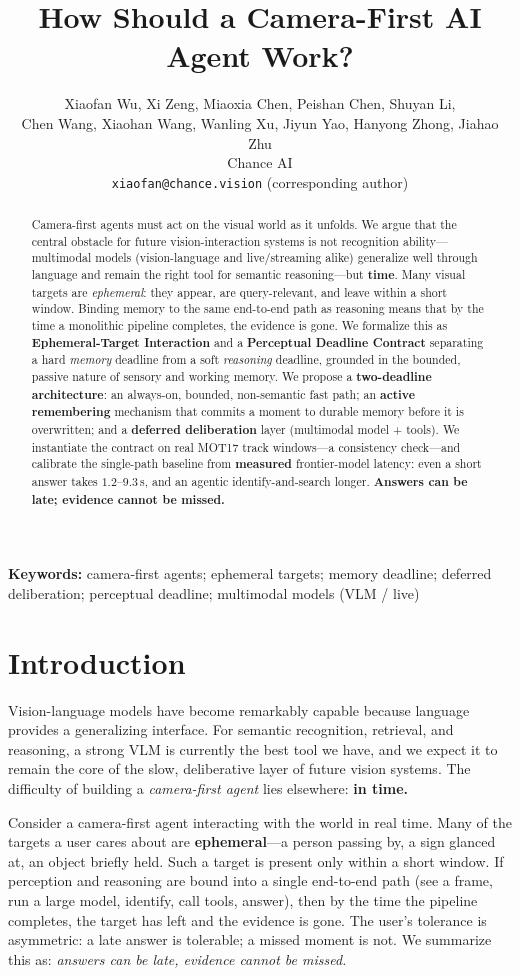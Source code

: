 \documentclass[11pt,a4paper]{article}
\title{How Should a Camera-First AI Agent Work?}
\author{Xiaofan Wu, Xi Zeng, Miaoxia Chen, Peishan Chen, Shuyan Li,\\
Chen Wang, Xiaohan Wang, Wanling Xu, Jiyun Yao, Hanyong Zhong, Jiahao Zhu\\
Chance AI\\
\texttt{xiaofan@chance.vision} (corresponding author)}
\date{}
\begin{document}
\maketitle

\begin{abstract}
Camera-first agents must act on the visual world as it unfolds. We argue that the central obstacle for future vision-interaction systems is not recognition ability---multimodal models (vision-language and live/streaming alike) generalize well through language and remain the right tool for semantic reasoning---but \textbf{time}. Many visual targets are \emph{ephemeral}: they appear, are query-relevant, and leave within a short window. Binding memory to the same end-to-end path as reasoning means that by the time a monolithic pipeline completes, the evidence is gone. We formalize this as \textbf{Ephemeral-Target Interaction} and a \textbf{Perceptual Deadline Contract} separating a hard \emph{memory} deadline from a soft \emph{reasoning} deadline, grounded in the bounded, passive nature of sensory and working memory. We propose a \textbf{two-deadline architecture}: an always-on, bounded, non-semantic fast path; an \textbf{active remembering} mechanism that commits a moment to durable memory before it is overwritten; and a \textbf{deferred deliberation} layer (multimodal model + tools). We instantiate the contract on real MOT17 track windows---a consistency check---and calibrate the single-path baseline from \textbf{measured} frontier-model latency: even a short answer takes $1.2$--$9.3$\,s, and an agentic identify-and-search longer. \textbf{Answers can be late; evidence cannot be missed.}
\end{abstract}

\noindent\textbf{Keywords:} camera-first agents; ephemeral targets; memory deadline; deferred deliberation; perceptual deadline; multimodal models (VLM / live)

\section{Introduction}
Vision-language models have become remarkably capable because language provides a generalizing interface. For semantic recognition, retrieval, and reasoning, a strong VLM is currently the best tool we have, and we expect it to remain the core of the slow, deliberative layer of future vision systems. The difficulty of building a \emph{camera-first agent} lies elsewhere: \textbf{in time.}

Consider a camera-first agent interacting with the world in real time. Many of the targets a user cares about are \textbf{ephemeral}---a person passing by, a sign glanced at, an object briefly held. Such a target is present only within a short window. If perception and reasoning are bound into a single end-to-end path (see a frame, run a large model, identify, call tools, answer), then by the time the pipeline completes, the target has left and the evidence is gone. The user's tolerance is asymmetric: a late answer is tolerable; a missed moment is not. We summarize this as: \emph{answers can be late, evidence cannot be missed.}
\end{document}
